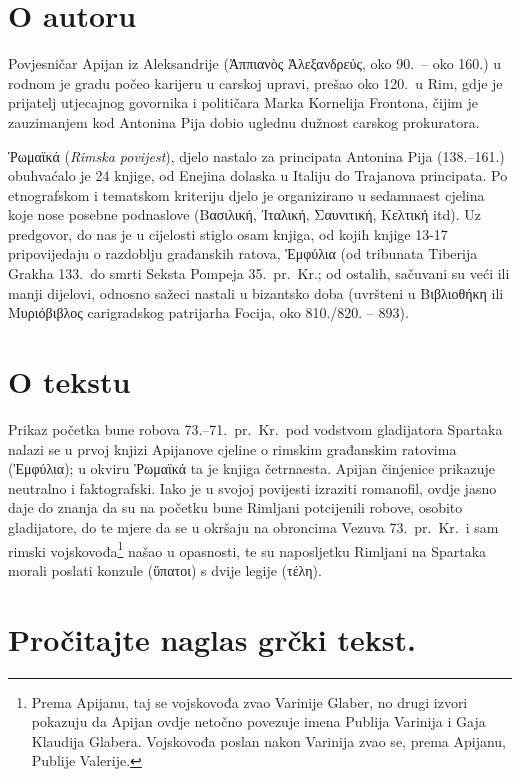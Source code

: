 \section*{O autoru}

Povjesničar Apijan iz Aleksandrije (Ἀππιανὸς Ἀλεξανδρεύς, oko 90.\ – oko 160.) u rodnom je gradu počeo karijeru u carskoj upravi, prešao oko 120.\ u Rim, gdje je prijatelj utjecajnog govornika i političara Marka Kornelija Frontona, čijim je zauzimanjem kod Antonina Pija dobio uglednu dužnost carskog prokuratora.

Ῥωμαϊκά (\textit{Rimska povijest}), djelo nastalo za principata Antonina Pija (138.–161.) obuhvaćalo je 24 knjige, od Enejina dolaska u Italiju do Trajanova principata. Po etnografskom i tematskom kriteriju djelo je organizirano u sedamnaest cjelina koje nose posebne podnaslove (Βασιλική, Ἰταλική, Σαυνιτική, Κελτική itd). Uz predgovor, do nas je u cijelosti stiglo osam knjiga, od kojih knjige 13-17 pripovijedaju o razdoblju građanskih ratova, Ἐμφύλια (od tribunata Tiberija Grakha 133.\ do smrti Seksta Pompeja 35.\ pr.~Kr.; od ostalih, sačuvani su veći ili manji dijelovi, odnosno sažeci nastali u bizantsko doba (uvršteni u Βιβλιοθήκη ili Μυριόβιβλος carigradskog patrijarha Focija, oko 810./820. – 893).

\section*{O tekstu}

Prikaz početka bune robova 73.–71.\ pr.~Kr.\ pod vodstvom gladijatora Spartaka nalazi se u prvoj knjizi Apijanove cjeline o rimskim građanskim ratovima (Ἐμφύλια); u okviru Ῥωμαϊκά ta je knjiga četrnaesta. Apijan činjenice prikazuje neutralno i faktografski. Iako je u svojoj povijesti izraziti romanofil, ovdje jasno daje do znanja da su na početku bune Rimljani potcijenili robove, osobito gladijatore, do te mjere da se u okršaju na obroncima Vezuva 73.\ pr.~Kr.\ i sam rimski vojskovođa\footnote{Prema Apijanu, taj se vojskovođa zvao Varinije Glaber, no drugi izvori pokazuju da Apijan ovdje netočno povezuje imena Publija Varinija i Gaja Klaudija Glabera. Vojskovođa poslan nakon Varinija zvao se, prema Apijanu, Publije Valerije.} našao u opasnosti, te su naposljetku Rimljani na Spartaka morali poslati konzule (ὕπατοι) s dvije legije (τέλη).


\section*{Pročitajte naglas grčki tekst.}

